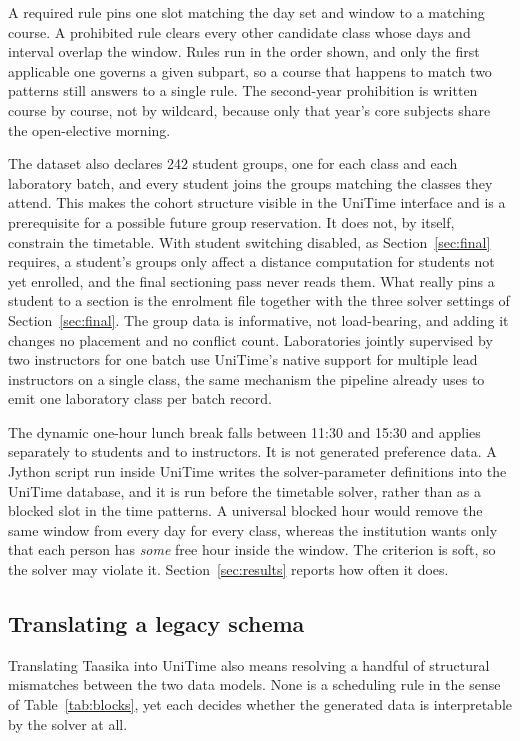 \documentclass[journal]{IEEEtran}
\begin{document}
A required rule pins one slot matching the day set and window to a matching course. A prohibited rule clears every other candidate class whose days and interval overlap the window. Rules run in the order shown, and only the first applicable one governs a given subpart, so a course that happens to match two patterns still answers to a single rule. The second-year prohibition is written course by course, not by wildcard, because only that year's core subjects share the open-elective morning.

The dataset also declares 242 student groups, one for each class and each laboratory batch, and every student joins the groups matching the classes they attend. This makes the cohort structure visible in the UniTime interface and is a prerequisite for a possible future group reservation. It does not, by itself, constrain the timetable. With student switching disabled, as Section~\ref{sec:final} requires, a student's groups only affect a distance computation for students not yet enrolled, and the final sectioning pass never reads them. What really pins a student to a section is the enrolment file together with the three solver settings of Section~\ref{sec:final}. The group data is informative, not load-bearing, and adding it changes no placement and no conflict count. Laboratories jointly supervised by two instructors for one batch use UniTime's native support for multiple lead instructors on a single class, the same mechanism the pipeline already uses to emit one laboratory class per batch record.

The dynamic one-hour lunch break falls between 11:30 and 15:30 and applies separately to students and to instructors. It is not generated preference data. A Jython script run inside UniTime writes the solver-parameter definitions into the UniTime database, and it is run before the timetable solver, rather than as a blocked slot in the time patterns. A universal blocked hour would remove the same window from every day for every class, whereas the institution wants only that each person has \emph{some} free hour inside the window. The criterion is soft, so the solver may violate it. Section~\ref{sec:results} reports how often it does.

\subsection{Translating a legacy schema}
Translating Taasika into UniTime also means resolving a handful of structural mismatches between the two data models. None is a scheduling rule in the sense of Table~\ref{tab:blocks}, yet each decides whether the generated data is interpretable by the solver at all.
\end{document}
